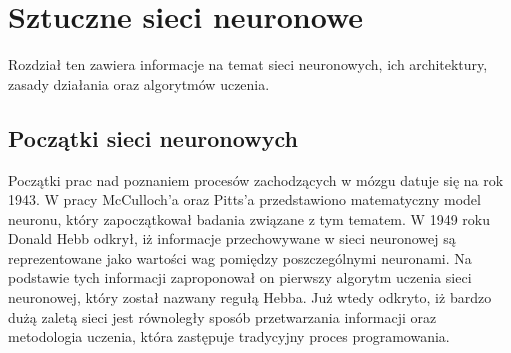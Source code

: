 \chapter{Sztuczne sieci neuronowe}
\label{cha:sztuczne_sieci_neuronowe}

Rozdział ten zawiera informacje na temat sieci neuronowych, ich architektury, zasady działania oraz algorytmów uczenia.

\section{Początki sieci neuronowych}
\label{sec:poczatki_sieci_neuronowych}
Początki prac nad poznaniem procesów zachodzących w mózgu datuje się na rok 1943. W pracy McCulloch'a oraz Pitts'a przedstawiono matematyczny model neuronu, który zapoczątkował badania związane z tym tematem. W 1949 roku Donald Hebb odkrył, iż informacje przechowywane w sieci neuronowej są reprezentowane jako wartości wag pomiędzy poszczególnymi neuronami. Na podstawie tych informacji zaproponował on pierwszy algorytm uczenia sieci neuronowej, który został nazwany regułą Hebba. Już wtedy odkryto, iż bardzo dużą zaletą sieci jest równoległy sposób przetwarzania informacji oraz metodologia uczenia, która zastępuje tradycyjny proces programowania. 


